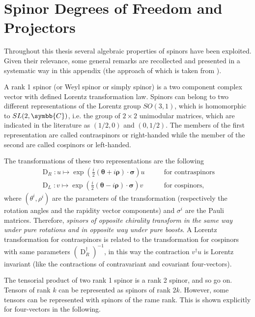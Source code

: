 \chapter{Spinor Degrees of Freedom and Projectors}

Throughout this thesis several algebraic properties of spinors have been exploited. Given their relevance, some general remarks are recollected and presented in a systematic way in this appendix (the approach of which is taken from \cite{Steane:2013wra}).

A rank 1 spinor (or Weyl spinor or simply spinor) is a two component complex vector with defined Lorentz transformation law. Spinors can belong to two different representations of the Lorentz group $SO(3,1)$, which is homomorphic to $SL(2,\symbb{C})$, i.e. the group of $2 \times 2$ unimodular matrices, which are indicated in the literature as $(1/2, 0)$ and $(0, 1/2)$. The members of the first representation are called contraspinors or right-handed while the member of the second are called cospinors or left-handed.

The transformations of these two representations are the following
\begin{align}
  \operatorname{D}_R \colon u \mapsto \exp{\left( \frac{i}{2} (\symbf{\theta} + i \symbf{\rho}) \cdot \symbf{\sigma}\right)} u & \qquad \text{for contraspinors} \\
  \label{eq:contraspinor_transformation}
  \operatorname{D}_L \colon v \mapsto \exp{\left( \frac{i}{2} (\symbf{\theta} - i \symbf{\rho}) \cdot \symbf{\sigma}\right)} v & \qquad \text{for cospinors} ,
\end{align}
where $(\theta^i, \rho^i)$ are the parameters of the transformation (respectively the rotation angles and the rapidity vector components) and $\sigma^i$ are the Pauli matrices. Therefore, \emph{spinors of opposite chirality transform in the same way under pure rotations and in opposite way under pure boosts}. A Lorentz transformation for contraspinors is related to the transformation for cospinors with same parameters $\left( \operatorname{D}^\dagger_R \right)^{-1}$, in this way the contraction $v^\dagger u$ is Lorentz invariant (like the contractions of contravariant and covariant four-vectors).

The tensorial product of two rank 1 spinor is a rank 2 spinor, and so go on. Tensors of rank $k$ can be represented as spinors of rank $2k$. However, some tensors can be represented with spinors of the rame rank. This is shown explicitly for four-vectors in the following.

